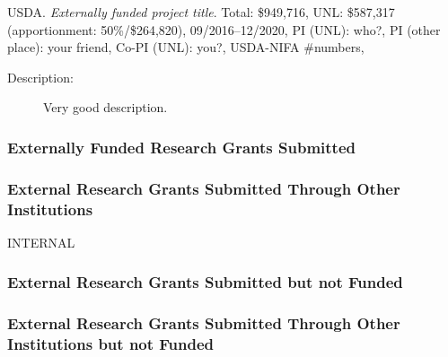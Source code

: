 \begin{grantsenum}
\item USDA. \emph{Externally funded project title}. Total: \$949,716, UNL:
  \$587,317 (apportionment: 50\%/\$264,820), 09/2016–12/2020, PI (UNL): who?, PI
  (other place): your friend, Co-PI (UNL): you?, USDA-NIFA \#numbers,
  \begin{description}
  \item[Description:] Very good description.
  \end{description}

\end{grantsenum}

\subsubsection{Externally Funded Research Grants Submitted}

\subsubsection{External Research Grants Submitted Through Other Institutions}



\begin{taggedblock}{INTERNAL}

  \subsubsection{External Research Grants Submitted but not Funded}

\end{taggedblock}

\subsubsection{External Research Grants Submitted Through Other Institutions but
  not Funded}

